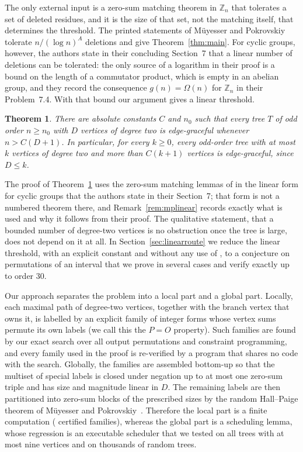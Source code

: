 \documentclass[11pt,a4paper]{article}
\theoremstyle{plain}
\newtheorem{theorem}{Theorem}[section]
\theoremstyle{definition}
\theoremstyle{remark}
\newcommand{\Z}{\mathbb{Z}}
\newcommand{\PO}{P\!=\!O}
\begin{document}
The only external input is a zero-sum matching theorem in $\Z_n$ that
tolerates a set of deleted residues, and it is the size of that set, not the
matching itself, that determines the threshold.  The printed statements of
M\"uyesser and Pokrovskiy~\cite{MuyesserPokrovskiy2025} tolerate
$n/(\log n)^{A}$ deletions and give Theorem~\ref{thm:main}.  For cyclic
groups, however, the authors state in their concluding Section~7 that a linear
number of deletions can be tolerated: the only source of a logarithm in their
proof is a bound on the length of a commutator product, which is empty in an
abelian group, and they record the consequence $g(n)=\Omega(n)$ for $\Z_n$
in their Problem~7.4.  With that bound our argument gives a linear threshold.

\begin{theorem}\label{thm:linear}
There are absolute constants $C$ and $n_0$ such that every tree $T$ of odd
order $n\ge n_0$ with $D$ vertices of degree two is edge-graceful whenever
$n>C(D+1)$.  In particular, for every $k\ge0$, every odd-order tree with at
most $k$ vertices of degree two and more than $C(k+1)$ vertices is
edge-graceful, since $D\le k$.
\end{theorem}

The proof of Theorem~\ref{thm:linear} uses the zero-sum matching lemmas of
\cite{MuyesserPokrovskiy2025} in the linear form for cyclic groups that the
authors state in their Section~7; that form is not a numbered theorem there,
and Remark~\ref{rem:mplinear} records exactly what is used and why it follows
from their proof.  The qualitative statement, that a bounded number of
degree-two vertices is no obstruction once the tree is large, does not depend
on it at all.  In Section~\ref{sec:linearroute} we reduce the linear
threshold, with an explicit constant and without any use of
\cite{MuyesserPokrovskiy2025}, to a conjecture on permutations of an interval
that we prove in several cases and verify exactly up to order $30$.

Our approach separates the problem into a local part and a global part.  Locally,
each maximal path of degree-two vertices, together with the branch vertex that
owns it, is labelled by an explicit family of integer forms whose vertex sums
permute its own labels (we call this the $\PO$ property).  Such families are
found by our exact search over all output permutations and constraint
programming, and every family used in the proof is re-verified by a program
that shares no code with the search.  Globally, the families are assembled
bottom-up so that the multiset of special labels is closed under negation up
to at most one zero-sum triple and has size and magnitude linear in $D$.  The
remaining labels are then partitioned into zero-sum blocks of the prescribed
sizes by the random Hall--Paige theorem of M\"uyesser and
Pokrovskiy~\cite{MuyesserPokrovskiy2025}.  Therefore the local part is a
finite computation (\NumCatFamilies{} certified families), whereas the
global part is a scheduling lemma, whose regression is an executable
scheduler that we tested on all trees with at most nine vertices and on
thousands of random trees.
\end{document}
